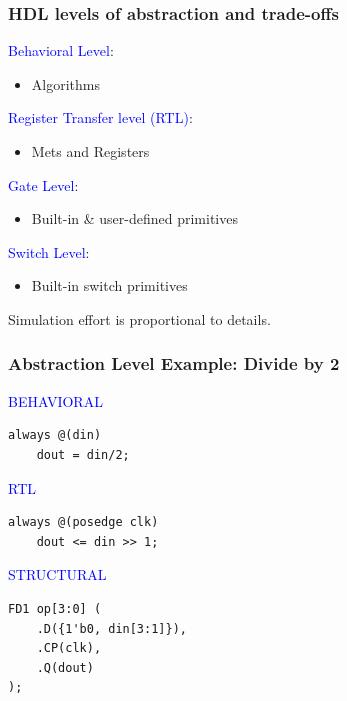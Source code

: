 \documentclass[t]{beamer}
\begin{document}
\begin{frame}
\frametitle{HDL levels of abstraction and trade-offs}

\textcolor{blue}{Behavioral Level}:
\begin{itemize}
\item Algorithms
\end{itemize}

\textcolor{blue}{Register Transfer level (RTL)}:
\begin{itemize}
\item Mets and Registers
\end{itemize}

\textcolor{blue}{Gate Level}:
\begin{itemize}
\item Built-in \& user-defined primitives
\end{itemize}

\textcolor{blue}{Switch Level}:
\begin{itemize}
\item Built-in switch primitives
\end{itemize}

\vspace{12pt}
Simulation effort is proportional to details.
\end{frame}

\begin{frame}[fragile]
\frametitle{Abstraction Level Example: Divide by 2}

\textcolor{blue}{BEHAVIORAL}
\begin{Verbatim}[tabsize=4]
always @(din)
	dout = din/2;
\end{Verbatim}

\textcolor{blue}{RTL}
\begin{Verbatim}[tabsize=4]
always @(posedge clk)
	dout <= din >> 1;
\end{Verbatim}

\textcolor{blue}{STRUCTURAL}
\begin{Verbatim}[tabsize=4]
FD1 op[3:0] (
	.D({1'b0, din[3:1]}),
	.CP(clk),
	.Q(dout)
);
\end{Verbatim}
\end{frame}
\end{document}
